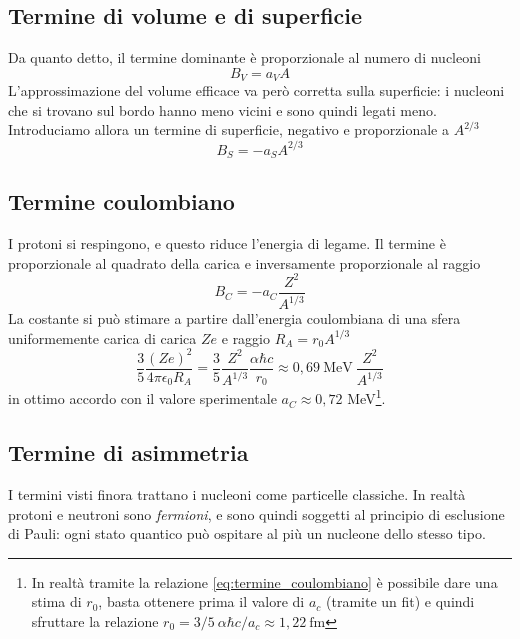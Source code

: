 \subsection{Termine di volume e di superficie}

Da quanto detto, il termine dominante è proporzionale al numero di nucleoni
%
\begin{equation}
    B_V = a_V A
\end{equation}
L'approssimazione del volume efficace va però corretta sulla superficie: i nucleoni che si trovano sul bordo hanno meno vicini e sono quindi legati meno. Introduciamo allora un termine di superficie, negativo e proporzionale a $A^{2/3}$
%
\begin{equation}
    B_S = - a_S A^{2/3}
\end{equation}

\subsection{Termine coulombiano}

I protoni si respingono, e questo riduce l'energia di legame. Il termine è proporzionale al quadrato della carica e inversamente proporzionale al raggio
%
\begin{equation}
    B_C = - a_C \frac{Z^2}{A^{1/3}}
\end{equation}
La costante si può stimare a partire dall'energia coulombiana di una sfera uniformemente carica di carica $Ze$ e raggio $R_A = r_0 A^{1/3}$
%
\begin{equation}
\label{eq:termine_coulombiano}
    \frac{3}{5} \frac{(Ze)^2}{4 \pi \epsilon_0 R_A} = \frac{3}{5} \frac{Z^2}{A^{1/3}} \frac{\alpha \hbar c}{r_0} \approx 0,69 \ \mathrm{MeV} \ \frac{Z^2}{A^{1/3}}
\end{equation}
in ottimo accordo con il valore sperimentale $a_C \approx 0,72$ MeV\footnote{In realtà tramite la relazione \eqref{eq:termine_coulombiano} è possibile dare una stima di $r_0$, basta ottenere prima il valore di $a_c$ (tramite un fit) e quindi sfruttare la relazione $r_0 = 3/5 \ \alpha \hbar c/a_c \approx 1,22 \ \text{fm}$}. 

\subsection{Termine di asimmetria}

I termini visti finora trattano i nucleoni come particelle classiche. In realtà protoni e neutroni sono \emph{fermioni}, e sono quindi soggetti al principio di esclusione di Pauli: ogni stato quantico può ospitare al più un nucleone dello stesso tipo. 

